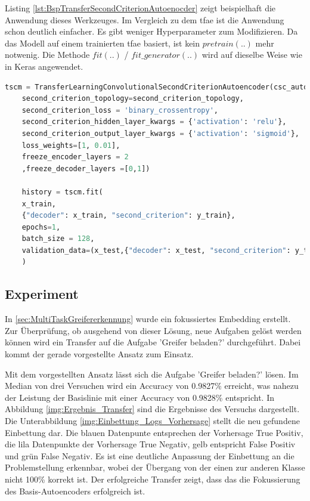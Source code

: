 	Listing \ref{lst:BspTransferSecondCriterionAutoenocder} zeigt beispielhaft die Anwendung dieses Werkzeuges. Im Vergleich zu dem \ac{tfae} ist die Anwendung schon deutlich einfacher. Es gibt weniger Hyperparameter zum Modifizieren. Da das Modell auf einem trainierten \ac{tfae} basiert, ist kein $pretrain(..)$ mehr notwenig. Die Methode $fit(..)$ / $fit\_generator(..)$ wird auf dieselbe Weise wie in Keras angewendet.	
	
	\begin{lstlisting}[language=python,caption=Beispiel TransferSecondCriterionAutoenocder in Python, label=lst:BspTransferSecondCriterionAutoenocder]
	tscm = TransferLearningConvolutionalSecondCriterionAutoencoder(csc_autoencoder,
	second_criterion_topology=second_criterion_topology,
	second_criterion_loss = 'binary_crossentropy',                                                                                                   
	second_criterion_hidden_layer_kwargs = {'activation': 'relu'},
	second_criterion_output_layer_kwargs = {'activation': 'sigmoid'}, 
	loss_weights=[1, 0.01],
	freeze_encoder_layers = 2
	,freeze_decoder_layers =[0,1])
	
	history = tscm.fit(
	x_train,
	{"decoder": x_train, "second_criterion": y_train}, 
	epochs=1,
	batch_size = 128,
	validation_data=(x_test,{"decoder": x_test, "second_criterion": y_test}))
	)
	\end{lstlisting}	
	
	\subsection{Experiment}
	\label{subsec:TransferLogs}
	In \ref{sec:MultiTaskGreifererkennung} wurde ein fokussiertes Embedding erstellt. Zur Überprüfung, ob ausgehend von dieser Lösung, neue Aufgaben gelöst werden können wird ein Transfer auf die Aufgabe 'Greifer beladen?' durchgeführt. Dabei kommt der gerade vorgestellte Ansatz zum Einsatz.  
	
	Mit dem vorgestellten Ansatz lässt sich die Aufgabe 'Greifer beladen?' lösen. Im Median von drei Versuchen wird ein Accuracy von 0.9827\% erreicht, was nahezu der Leistung der Basislinie mit einer Accuracy von 0.9828\% entspricht. In Abbildung \ref{img:Ergebnis_Transfer} sind die Ergebnisse des Versuchs dargestellt. Die Unterabbildung \ref{img:Einbettung_Logs_Vorhersage} stellt die neu gefundene Einbettung dar. Die blauen Datenpunte entsprechen der Vorhersage True Positiv, die lila Datenpunkte der Vorhersage True Negativ, gelb entspricht False Positiv und grün False Negativ. Es ist eine deutliche Anpassung der Einbettung an die Problemstellung erkennbar, wobei der Übergang von der einen zur anderen Klasse nicht 100\% korrekt ist. Der erfolgreiche Transfer zeigt, dass das die Fokussierung des Basis-Autoencoders erfolgreich ist.     

